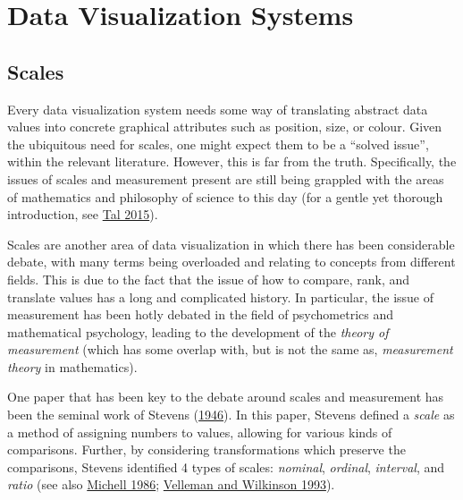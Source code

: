 \documentclass[
]{book}
\theoremstyle{definition}
\theoremstyle{definition}
\theoremstyle{definition}
\theoremstyle{definition}
\theoremstyle{remark}
\begin{document}
\hypertarget{data-visualization-systems}{%
\section{Data Visualization Systems}\label{data-visualization-systems}}

\hypertarget{scales}{%
\subsection{Scales}\label{scales}}

Every data visualization system needs some way of translating abstract data values into concrete graphical attributes such as position, size, or colour. Given the ubiquitous need for scales, one might expect them to be a ``solved issue'', within the relevant literature. However, this is far from the truth. Specifically, the issues of scales and measurement present are still being grappled with the areas of mathematics and philosophy of science to this day (for a gentle yet thorough introduction, see \protect\hyperlink{ref-tal2015}{Tal 2015}).

Scales are another area of data visualization in which there has been considerable debate, with many terms being overloaded and relating to concepts from different fields. This is due to the fact that the issue of how to compare, rank, and translate values has a long and complicated history. In particular, the issue of measurement has been hotly debated in the field of psychometrics and mathematical psychology, leading to the development of the \emph{theory of measurement} (which has some overlap with, but is not the same as, \emph{measurement theory} in mathematics).

One paper that has been key to the debate around scales and measurement has been the seminal work of Stevens (\protect\hyperlink{ref-stevens1946}{1946}). In this paper, Stevens defined a \emph{scale} as a method of assigning numbers to values, allowing for various kinds of comparisons. Further, by considering transformations which preserve the comparisons, Stevens identified 4 types of scales: \emph{nominal}, \emph{ordinal}, \emph{interval}, and \emph{ratio} (see also \protect\hyperlink{ref-michell1986}{Michell 1986}; \protect\hyperlink{ref-velleman1993}{Velleman and Wilkinson 1993}).
\end{document}
